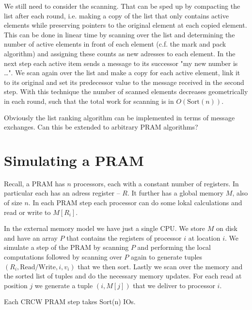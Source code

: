 We still need to consider the scanning. That can be sped up by compacting the list after each round, i.e. making a copy of the list that only contains active elements while preserving pointers to the original element at each copied element. This can be done in linear time by scanning over the list and determining the number of active elements in front of each element (c.f. the mark and pack algorithm) and assigning these counts as new adresses to each element. In the next step each active item sends a message to its successor "my new number is \ldots". We scan again over the list and make a copy for each active element, link it to its original and set its predecessor value to the message received in the second step. With this technique the number of scanned elements decreases geometrically in each round, such that the total work for scanning is in $O(\text{Sort}(n))$.

Obviously the list ranking algorithm can be implemented in terms of message exchanges. Can this be extended to arbitrary PRAM algorithms?

\section{Simulating a PRAM}
	
Recall, a PRAM has $n$ processors, each with a constant number of registers. In particular each has an adress register -- $R$. It further has a global memory $M$, also of size $n$. In each PRAM step each processor can do some lokal calculations and read or write to $M[R_i]$.

In the external memory model we have just a single CPU. We store $M$ on disk and have an array $P$ that contains the registers of processor $i$ at location $i$. We simulate a step of the PRAM by scanning $P$ and performing the local computations followed by scanning over $P$ again to generate tuples $(R_i, \text{Read/Write}, i, v_i)$ that we then sort. Lastly we scan over the memory and the sorted list of tuples and do the necessary memory updates. For each read at position $j$ we generate a tuple $(i,M[j])$ that we deliver to processor $i$.

\begin{thm} Each CRCW PRAM step takes Sort(n) IOs.\end{thm}
